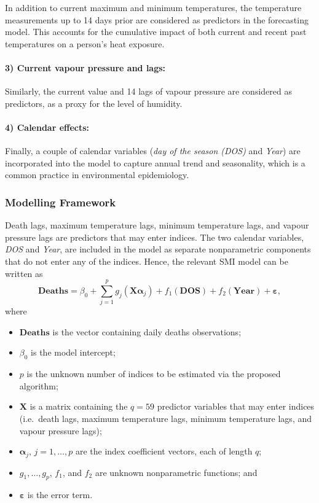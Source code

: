 \documentclass[
  11pt,
  a4paper,
]{report}
\providecommand{\tightlist}{%
  \setlength{\itemsep}{0pt}\setlength{\parskip}{0pt}}\usepackage{longtable,booktabs,array}
\begin{document}
In addition to current maximum and minimum temperatures, the temperature
measurements up to 14 days prior are considered as predictors in the
forecasting model. This accounts for the cumulative impact of both
current and recent past temperatures on a person's heat exposure.

\paragraph{3) Current vapour pressure and
lags:}\label{current-vapour-pressure-and-lags}

Similarly, the current value and 14 lags of vapour pressure are
considered as predictors, as a proxy for the level of humidity.

\paragraph{4) Calendar effects:}\label{calendar-effects}

Finally, a couple of calendar variables (\emph{day of the season (DOS)}
and \emph{Year}) are incorporated into the model to capture annual trend
and seasonality, which is a common practice in environmental
epidemiology.

\subsubsection{Modelling Framework}\label{modelling-framework}

Death lags, maximum temperature lags, minimum temperature lags, and
vapour pressure lags are predictors that may enter indices. The two
calendar variables, \emph{DOS} and \emph{Year}, are included in the
model as separate nonparametric components that do not enter any of the
indices. Hence, the relevant SMI model can be written as \[
  \textbf{Deaths} = \beta_{0} + \sum_{j = 1}^{p}{g_{j}(\bm{X}\bm{\alpha}_{j})} + f_{1}(\textbf{DOS}) + f_{2}(\textbf{Year})+ \bm{\varepsilon},
\] where

\begin{itemize}
\tightlist
\item
  \(\textbf{Deaths}\) is the vector containing daily deaths
  observations;
\item
  \(\beta_{0}\) is the model intercept;
\item
  \(p\) is the unknown number of indices to be estimated via the
  proposed algorithm;
\item
  \(\bm{X}\) is a matrix containing the \(q=59\) predictor variables
  that may enter indices (i.e.~death lags, maximum temperature lags,
  minimum temperature lags, and vapour pressure lags);
\item
  \(\bm{\alpha}_{j}\), \(j = 1, \dots, p\) are the index coefficient
  vectors, each of length \(q\);
\item
  \(g_{1}, \dots,g_p\), \(f_{1}\), and \(f_{2}\) are unknown
  nonparametric functions; and
\item
  \(\bm{\varepsilon}\) is the error term.
\end{itemize}
\end{document}
